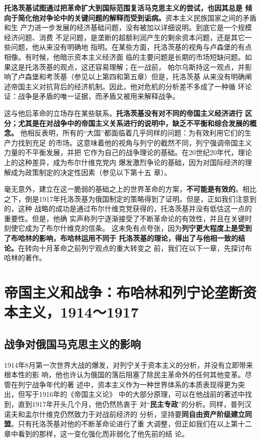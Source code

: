\textbf{托洛茨基试图通过把革命扩大到国际范围复活马克思主义的尝试，也因其总是
倾向于简化他对争论中的关键问题的解释而受到诟病。}资本主义民族国家之间的矛盾和生
产力进一步发展的经济基础问题，没有被加以详细说明。到底它是一个规模经济问题、消费
不足问题，是垄断的超额利润产生的剩余资本问题，还是其它一些问题，他从来没有明确地
指明。在某些方面，托洛茨基的视角与卢森堡的有点相像。有时候，他暗示资本主义经济面
临的主要问题是长期的市场短缺问题。如果这是托洛茨基的观点，这还容易理解；在一战前，
帕尔乌斯持这一观点，并影响了卢森堡和考茨基（参见以上第四和第五章）但是，托洛茨基
从来没有明确阐述帝国主义对抗背后的经济机制。因此，他对危机的分析差不多成了一种循
环论证：战争是矛盾的唯一证据，而矛盾又被用来解释战争。

这与他后革命的立场存在某些联系。\textbf{托洛茨基没有对不同的帝国主义经济进行
区分；尤其是在对战争中的帝国主义关系进行的说明中，缺乏不平衡和综合发展的概念。}
他相反表明，所有的“大国”都面临着几乎同样的问题：为有效利用它们的生产力找到充足
的市场。这意味着他的视角与列宁的截然不同，列宁强调帝国主义力量的不平衡发展，并把
它作为自己的战争理论的基础。在20世纪20年代，理论上的这种差异，成为布尔什维克党内
爆发激烈争论的基础，因为对国际经济的理解成为政策制定的决定性因素（参见以下第十五
章）。

毫无意外，建立在这一脆弱的基础之上的世界革命的方案，\textbf{不可能是有效的}。相比
之下，倒是1917年托洛茨基为俄国制定的策略得到了证明。但是，正如我们注意到的，这种
战略的成功是通过布尔什维克党获得的，托洛茨基并没有低估这一点的重要性。但是，他确
实声称列宁逐渐接受了不断革命论的有效性，并且在关键时刻使它成为了布尔什维克的信条。
这未免有点夸张，因为\textbf{列宁更大程度上是受到了布哈林的影响，布哈林运用不同于
  托洛茨基的理论，得出了与他相一致的结论。}在转向十月革命之前列宁观点的重大转变之
前，我们在以下一章，先探讨布哈林的著作。


\chapter[帝国主义和战争]{帝国主义和战争：布哈林和列宁论垄断资本主义，1914～1917}

\section{战争对俄国马克思主义的影响}

1914年8月第一次世界大战的爆发，对列宁关于资本主义的分析，并没有立即带来根本性的影
响，他也许认为俄国的落后阻塞了除民主革命外的任何其他变革。尽管在列宁战争年代的著
述中，资本主义作为一种世界体系的本质表现得更为突出，但写于1916年的《帝国主义论》
中的大部分原理，可以在他战前的著述中找到，直到1917年开头几个月，他仍然热衷于
对“\textbf{民主专政}”的分析。同样，普列汉诺夫和孟尔什维克仍然致力于对战前经济的
分析，坚持要\textbf{同自由资产阶级建立同盟}。只有托洛茨基对他的不断革命论进行了重
大调整，但正如我们在以上第十二章中看到的那样，这一变化强化而非弱化了他先前的结
论。

